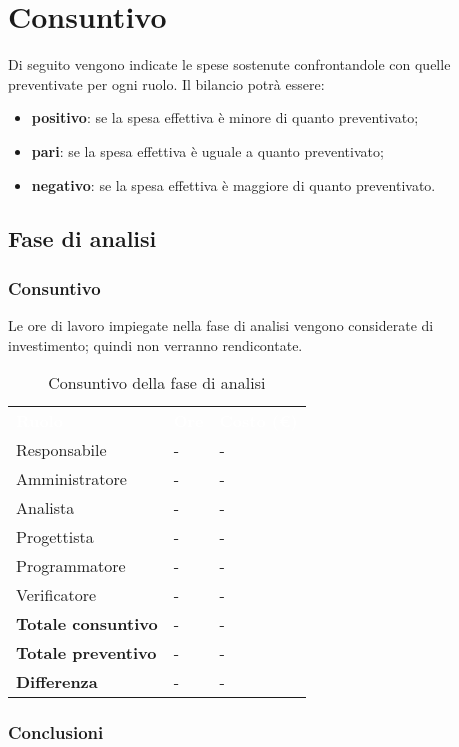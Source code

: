 \section{Consuntivo}
Di seguito vengono indicate le spese sostenute confrontandole con quelle preventivate per ogni ruolo.  Il bilancio potrà essere:
\begin{itemize}
\item \textbf{positivo}: se la spesa effettiva è minore di quanto preventivato;
\item \textbf{pari}: se la spesa effettiva è uguale a quanto preventivato;
\item \textbf{negativo}: se la spesa effettiva è maggiore di quanto preventivato.
\end{itemize}

\subsection{Fase di analisi}
\subsubsection{Consuntivo}
Le ore di lavoro impiegate nella fase di analisi vengono considerate di investimento; quindi non verranno rendicontate.

\begin{table}[!htbp]
\begin{center}
\renewcommand{\arraystretch}{1.5}
\begin{tabular}{ m{}<{\centering}  m{}<{\centering} m{}<{\centering}}
	\rowcolor{darkblue}
	\textcolor{white}{\textbf{Ruolo}}&\textcolor{white}{\textbf{Ore}}&\textcolor{white}{\textbf{Costo (\euro) }}\\ 

	Responsabile  & - & - \\	

	\rowcolor{gray!10} Amministratore & - & - \\
	
	Analista & - & - \\
	
	\rowcolor{gray!10} Progettista & - & - \\
	
	Programmatore & - & - \\
	
	\rowcolor{gray!10} Verificatore & - & - \\
	
	\textbf{Totale consuntivo } & - & - \\
	
	\rowcolor{gray!10} \textbf{Totale preventivo} & - & - \\
	
	\textbf{Differenza } & - & - \\
	
\end{tabular}
\caption{Consuntivo della fase di analisi}
\end{center}
\end{table}

\subsubsection{Conclusioni}